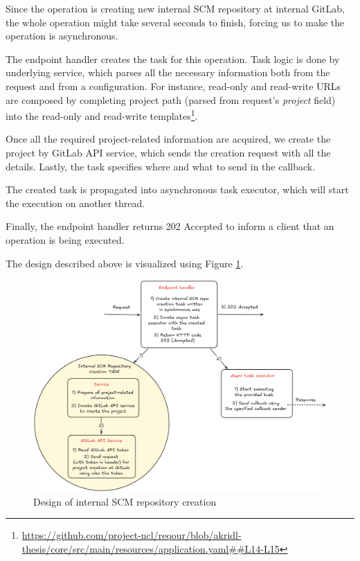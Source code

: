 \documentclass[./main.tex]{subfiles}
\begin{document}
Since the operation is creating new internal SCM repository at internal GitLab, the whole operation might take several seconds to finish, forcing us to make the operation is asynchronous.

The endpoint handler creates the task for this operation. Task logic is done by underlying service, which parses all the necessary information both from the request and from a configuration. For instance, read-only and read-write URLs are composed by completing project path (parsed from request's \textit{project} field) into the read-only and read-write templates\footnote{\url{https://github.com/project-ncl/reqour/blob/akridl-thesis/core/src/main/resources/application.yaml##L14-L15}}.

Once all the required project-related information are acquired, we create the project by GitLab API service, which sends the creation request with all the details. Lastly, the task specifies where and what to send in the callback.

The created task is propagated into asynchronous task executor, which will start the execution on another thread.

Finally, the endpoint handler returns 202 Accepted to inform a client that an operation is being executed.

The design described above is visualized using Figure \ref{fig:internal-scm-design}.

\begin{figure}
  \begin{center}
    \includegraphics[width=\textwidth]{images/internal-scm-design.png}
  \end{center}
  \caption{Design of internal SCM repository creation}
  \label{fig:internal-scm-design}
\end{figure}
\end{document}
